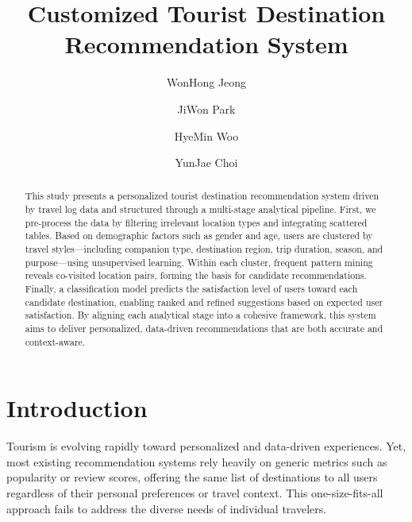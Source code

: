 \documentclass[sigconf]{acmart}
\begin{document}
\title{Customized Tourist Destination Recommendation System}

\author{WonHong Jeong}

\author{JiWon Park}

\author{HyeMin Woo}

\author{YunJae Choi}




\begin{abstract}
This study presents a personalized tourist destination recommendation system driven by travel log data and structured through a multi-stage analytical pipeline. First, we pre-process the data by filtering irrelevant location types and integrating scattered tables. Based on demographic factors such as gender and age, users are clustered by travel styles—including companion type, destination region, trip duration, season, and purpose—using unsupervised learning. Within each cluster, frequent pattern mining reveals co-visited location pairs, forming the basis for candidate recommendations. Finally, a classification model predicts the satisfaction level of users toward each candidate destination, enabling ranked and refined suggestions based on expected user satisfaction. By aligning each analytical stage into a cohesive framework, this system aims to deliver personalized, data-driven recommendations that are both accurate and context-aware.
\end{abstract}


\maketitle

\section{Introduction}

Tourism is evolving rapidly toward personalized and data-driven experiences. Yet, most existing recommendation systems rely heavily on generic metrics such as popularity or review scores, offering the same list of destinations to all users regardless of their personal preferences or travel context. This one-size-fits-all approach fails to address the diverse needs of individual travelers.
\end{document}
